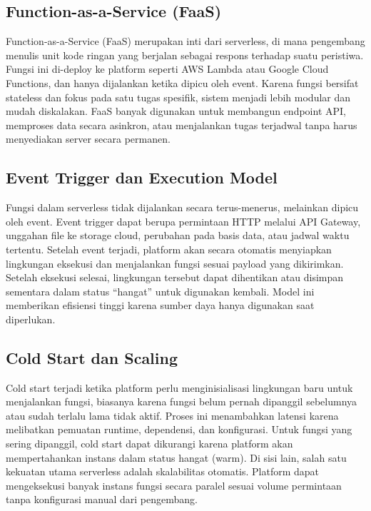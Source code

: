 \subsection{Function-as-a-Service (FaaS)}

Function-as-a-Service (FaaS) merupakan inti dari serverless, di mana pengembang menulis unit kode ringan yang berjalan sebagai respons terhadap suatu peristiwa. Fungsi ini di-deploy ke platform seperti AWS Lambda atau Google Cloud Functions, dan hanya dijalankan ketika dipicu oleh event. Karena fungsi bersifat stateless dan fokus pada satu tugas spesifik, sistem menjadi lebih modular dan mudah diskalakan. FaaS banyak digunakan untuk membangun endpoint API, memproses data secara asinkron, atau menjalankan tugas terjadwal tanpa harus menyediakan server secara permanen.

\subsection{Event Trigger dan Execution Model}

Fungsi dalam serverless tidak dijalankan secara terus-menerus, melainkan dipicu oleh event. Event trigger dapat berupa permintaan HTTP melalui API Gateway, unggahan file ke storage cloud, perubahan pada basis data, atau jadwal waktu tertentu. Setelah event terjadi, platform akan secara otomatis menyiapkan lingkungan eksekusi dan menjalankan fungsi sesuai payload yang dikirimkan. Setelah eksekusi selesai, lingkungan tersebut dapat dihentikan atau disimpan sementara dalam status “hangat” untuk digunakan kembali. Model ini memberikan efisiensi tinggi karena sumber daya hanya digunakan saat diperlukan.

\subsection{Cold Start dan Scaling}

Cold start terjadi ketika platform perlu menginisialisasi lingkungan baru untuk menjalankan fungsi, biasanya karena fungsi belum pernah dipanggil sebelumnya atau sudah terlalu lama tidak aktif. Proses ini menambahkan latensi karena melibatkan pemuatan runtime, dependensi, dan konfigurasi. Untuk fungsi yang sering dipanggil, cold start dapat dikurangi karena platform akan mempertahankan instans dalam status hangat (warm). Di sisi lain, salah satu kekuatan utama serverless adalah skalabilitas otomatis. Platform dapat mengeksekusi banyak instans fungsi secara paralel sesuai volume permintaan tanpa konfigurasi manual dari pengembang.

